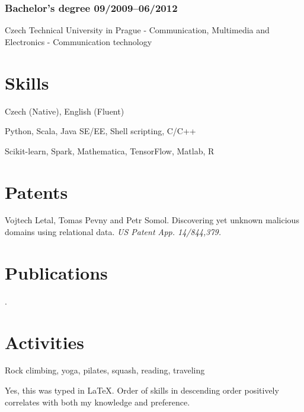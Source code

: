 \documentclass[10pt]{article}
\begin{document}
\subsubsection*{\bf Bachelor’s degree \hfill 09/2009--06/2012}
\vspace{-1.5mm}
Czech Technical University in Prague - Communication, Multimedia and Electronics - Communication technology

\section*{Skills}
\begin{description}
	\setlength\itemsep{0.05em}
	\item[Languages] Czech (Native), English (Fluent)
	\item[Programming] Python, Scala, Java SE/EE, Shell scripting, C/C++
	\item[Analytics] Scikit-learn, Spark, Mathematica, TensorFlow, Matlab, R
\end{description}

\section*{Patents}
Vojtech Letal, Tomas Pevny and Petr Somol. Discovering yet unknown malicious domains using relational data. {\it US Patent App. 14/844,379.}



\section*{Publications}
.

\section*{Activities}
Rock climbing, yoga, pilates, squash, reading, traveling


{\vfill
\scriptsize\hfill Yes, this was typed in \LaTeX. Order of skills in descending order positively correlates with both my knowledge and preference.}

\end{document}

